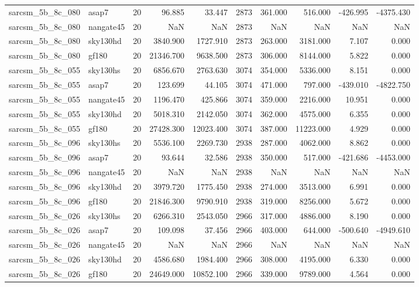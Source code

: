 \begin{longtable}{llrrrrrrrr}
sarcsm\_5b\_8c\_080 & asap7 & 20 & 96.885 & 33.447 & 2873 & 361.000 & 516.000 & -426.995 & -4375.430 \\
sarcsm\_5b\_8c\_080 & nangate45 & 20 & NaN & NaN & 2873 & NaN & NaN & NaN & NaN \\
sarcsm\_5b\_8c\_080 & sky130hd & 20 & 3840.900 & 1727.910 & 2873 & 263.000 & 3181.000 & 7.107 & 0.000 \\
sarcsm\_5b\_8c\_080 & gf180 & 20 & 21346.700 & 9638.500 & 2873 & 306.000 & 8144.000 & 5.822 & 0.000 \\
sarcsm\_5b\_8c\_055 & sky130hs & 20 & 6856.670 & 2763.630 & 3074 & 354.000 & 5336.000 & 8.151 & 0.000 \\
sarcsm\_5b\_8c\_055 & asap7 & 20 & 123.699 & 44.105 & 3074 & 471.000 & 797.000 & -439.010 & -4822.750 \\
sarcsm\_5b\_8c\_055 & nangate45 & 20 & 1196.470 & 425.866 & 3074 & 359.000 & 2216.000 & 10.951 & 0.000 \\
sarcsm\_5b\_8c\_055 & sky130hd & 20 & 5018.310 & 2142.050 & 3074 & 362.000 & 4575.000 & 6.355 & 0.000 \\
sarcsm\_5b\_8c\_055 & gf180 & 20 & 27428.300 & 12023.400 & 3074 & 387.000 & 11223.000 & 4.929 & 0.000 \\
sarcsm\_5b\_8c\_096 & sky130hs & 20 & 5536.100 & 2269.730 & 2938 & 287.000 & 4062.000 & 8.862 & 0.000 \\
sarcsm\_5b\_8c\_096 & asap7 & 20 & 93.644 & 32.586 & 2938 & 350.000 & 517.000 & -421.686 & -4453.000 \\
sarcsm\_5b\_8c\_096 & nangate45 & 20 & NaN & NaN & 2938 & NaN & NaN & NaN & NaN \\
sarcsm\_5b\_8c\_096 & sky130hd & 20 & 3979.720 & 1775.450 & 2938 & 274.000 & 3513.000 & 6.991 & 0.000 \\
sarcsm\_5b\_8c\_096 & gf180 & 20 & 21846.300 & 9790.910 & 2938 & 319.000 & 8256.000 & 5.672 & 0.000 \\
sarcsm\_5b\_8c\_026 & sky130hs & 20 & 6266.310 & 2543.050 & 2966 & 317.000 & 4886.000 & 8.190 & 0.000 \\
sarcsm\_5b\_8c\_026 & asap7 & 20 & 109.098 & 37.456 & 2966 & 403.000 & 644.000 & -500.640 & -4949.610 \\
sarcsm\_5b\_8c\_026 & nangate45 & 20 & NaN & NaN & 2966 & NaN & NaN & NaN & NaN \\
sarcsm\_5b\_8c\_026 & sky130hd & 20 & 4586.680 & 1984.400 & 2966 & 308.000 & 4195.000 & 6.330 & 0.000 \\
sarcsm\_5b\_8c\_026 & gf180 & 20 & 24649.000 & 10852.100 & 2966 & 339.000 & 9789.000 & 4.564 & 0.000 \\

\end{longtable}
